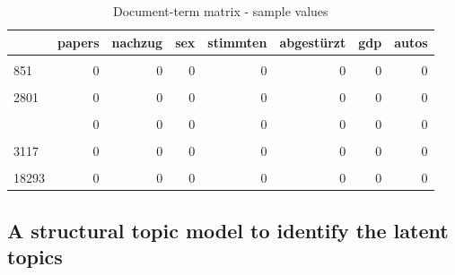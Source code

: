 \documentclass[
  12pt,
]{article}
\begin{document}
\begin{table}[H]

\caption{\label{tab:Document term matrix}Document-term matrix - sample values \label{table:dtm}}
\centering
\fontsize{7}{9}\selectfont
\begin{tabular}[t]{lrrrrrrr}
\toprule
  & papers & nachzug & sex & stimmten & abgestürzt & gdp & autos\\
\midrule
\cellcolor{gray!6}{14317} & \cellcolor{gray!6}{0} & \cellcolor{gray!6}{0} & \cellcolor{gray!6}{0} & \cellcolor{gray!6}{0} & \cellcolor{gray!6}{0} & \cellcolor{gray!6}{0} & \cellcolor{gray!6}{0}\\
851 & 0 & 0 & 0 & 0 & 0 & 0 & 0\\
\cellcolor{gray!6}{96} & \cellcolor{gray!6}{0} & \cellcolor{gray!6}{0} & \cellcolor{gray!6}{0} & \cellcolor{gray!6}{0} & \cellcolor{gray!6}{0} & \cellcolor{gray!6}{0} & \cellcolor{gray!6}{0}\\
2801 & 0 & 0 & 0 & 0 & 0 & 0 & 0\\
\cellcolor{gray!6}{13257} & \cellcolor{gray!6}{0} & \cellcolor{gray!6}{0} & \cellcolor{gray!6}{0} & \cellcolor{gray!6}{0} & \cellcolor{gray!6}{0} & \cellcolor{gray!6}{0} & \cellcolor{gray!6}{0}\\
\addlinespace
14957 & 0 & 0 & 0 & 0 & 0 & 0 & 0\\
\cellcolor{gray!6}{2308} & \cellcolor{gray!6}{0} & \cellcolor{gray!6}{0} & \cellcolor{gray!6}{0} & \cellcolor{gray!6}{0} & \cellcolor{gray!6}{0} & \cellcolor{gray!6}{0} & \cellcolor{gray!6}{0}\\
3117 & 0 & 0 & 0 & 0 & 0 & 0 & 0\\
\cellcolor{gray!6}{6357} & \cellcolor{gray!6}{0} & \cellcolor{gray!6}{0} & \cellcolor{gray!6}{0} & \cellcolor{gray!6}{1} & \cellcolor{gray!6}{0} & \cellcolor{gray!6}{0} & \cellcolor{gray!6}{0}\\
18293 & 0 & 0 & 0 & 0 & 0 & 0 & 0\\
\bottomrule
\end{tabular}
\end{table}

\hypertarget{a-structural-topic-model-to-identify-the-latent-topics}{%
\subsection{A structural topic model to identify the latent
topics}\label{a-structural-topic-model-to-identify-the-latent-topics}}
\end{document}
